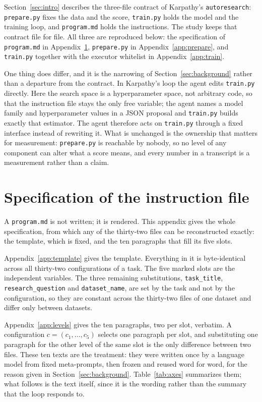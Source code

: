\documentclass[11pt]{article}
\begin{document}
Section~\ref{sec:intro} describes the three-file contract of Karpathy's
\texttt{autoresearch}: \texttt{prepare.py} fixes the data and the score,
\texttt{train.py} holds the model and the training loop, and \texttt{program.md} holds
the instructions. The study keeps that contract file for file. All three are reproduced
below: the specification of \texttt{program.md} in Appendix~\ref{app:program},
\texttt{prepare.py} in Appendix~\ref{app:prepare}, and \texttt{train.py} together with the
executor whitelist in Appendix~\ref{app:train}.

One thing does differ, and it is the narrowing of Section~\ref{sec:background} rather than a
departure from the contract. In Karpathy's loop the agent edits \texttt{train.py}
directly. Here the search space is a hyperparameter space, not arbitrary code, so that
the instruction file stays the only free variable; the agent names a model family and
hyperparameter values in a JSON proposal and \texttt{train.py} builds exactly that
estimator. The agent therefore acts on \texttt{train.py} through a fixed interface
instead of rewriting it. What is unchanged is the ownership that matters for
measurement: \texttt{prepare.py} is reachable by nobody, so no level of any component
can alter what a score means, and every number in a transcript is a measurement rather
than a claim.

\section{Specification of the instruction file}
\label{app:program}

A \texttt{program.md} is not written; it is rendered. This appendix gives the whole
specification, from which any of the thirty-two files can be reconstructed exactly: the
template, which is fixed, and the ten paragraphs that fill its five slots.

Appendix~\ref{app:template} gives the template. Everything in it is byte-identical
across all thirty-two configurations of a task. The five marked slots are the
independent variables. The three remaining substitutions, \texttt{task\_title},
\texttt{research\_question} and \texttt{dataset\_name}, are set by the task and not by
the configuration, so they are constant across the thirty-two files of one dataset and
differ only between datasets.

Appendix~\ref{app:levels} gives the ten paragraphs, two per slot, verbatim. A
configuration $c = (c_1,\ldots,c_5)$ selects one paragraph per slot, and substituting
one paragraph for the other level of the same slot is the only difference between two
files. These ten texts are the treatment: they were written once by a language model
from fixed meta-prompts, then frozen and reused word for word, for the reason given in
Section~\ref{sec:background}. Table~\ref{tab:axes} summarizes them; what follows is the text
itself, since it is the wording rather than the summary that the loop responds to.
\end{document}
